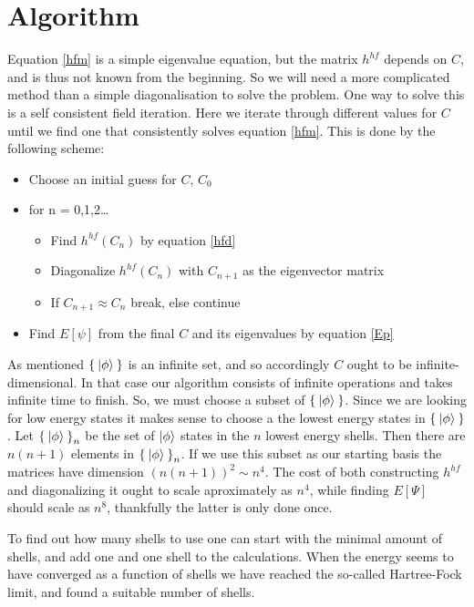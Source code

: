 \documentclass[a4paper,english,12pt]{article}
\begin{document}
\section{Algorithm}
Equation \ref{hfm} is a simple eigenvalue equation, but the matrix  $h^{hf}$ depends on $C$, and is thus not known from the beginning. So we will need a more complicated
method than a simple diagonalisation to solve the problem. One way to solve this is a self consistent field iteration.\cite{mortenslides} Here we iterate through
different values for $C$ until we find one that consistently solves equation \ref{hfm}. This is done by the following scheme:
\begin{itemize}
\item
  Choose an initial guess for $C$, $C_0$
\item for n = 0,1,2\ldots
  \begin{itemize}
  \item Find $h^{hf}(C_n)$ by equation \ref{hfd}
  \item Diagonalize $h^{hf}(C_n)$ with $C_{n+1}$ as the eigenvector matrix
  \item If $C_{n+1}\approx C_n$ break, else continue
  \end{itemize}
\item
  Find $E[\psi]$ from the final $C$ and its eigenvalues by equation \ref{Ep}
\end{itemize}

As mentioned \(\Set{\Ket{\phi}}\) is an infinite set, and so accordingly $C$ ought to be infinite-dimensional.
In that case our algorithm consists of infinite operations and takes infinite time to finish.
So, we must choose a subset of \(\Set{\Ket{\phi}}\).
Since we are looking for low energy states it makes sense to choose a the lowest energy states in \(\Set{\Ket{\phi}}\).
Let \(\Set{\Ket{\phi}}_n\) be the set of $\ket{\phi}$ states in the $n$ lowest energy shells. Then there are $n(n+1)$ elements in
\(\Set{\Ket{\phi}}_n\). If we use this subset as our starting basis the matrices have dimension $(n(n+1))^2\sim n^4$. The cost of both constructing
$h^{hf}$ and diagonalizing it ought to scale aproximately as $n^4$, while finding $E[\Psi]$ should scale as $n^8$, thankfully the latter is only done
once.

To find out how many shells to use one can start with the minimal amount of shells, and add one and one shell to the calculations. When the energy seems
to have converged as a function of shells we have reached the so-called Hartree-Fock limit, and found a suitable number of shells.  
\end{document}
